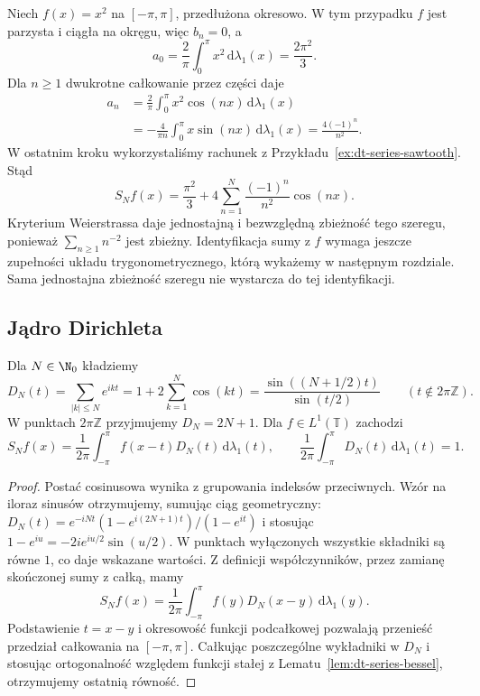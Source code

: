 \begin{przyklad}
\label{ex:dt-series-quadratic}
Niech $f(x)=x^2$ na $[-\pi,\pi]$, przedłużona okresowo.
W tym przypadku $f$ jest parzysta i ciągła na okręgu,
więc $b_n=0$, a
\[
 a_0=\frac2\pi\int_0^\pi x^2\,\mathrm d\lambda_1(x)
 =\frac{2\pi^2}3.
\]
Dla $n\ge1$ dwukrotne całkowanie przez części daje
\[
 \begin{aligned}
 a_n&=\frac2\pi\int_0^\pi x^2\cos(nx)\,\mathrm d\lambda_1(x)\\
 &=-\frac4{\pi n}\int_0^\pi x\sin(nx)\,\mathrm d\lambda_1(x)
 =\frac{4(-1)^n}{n^2}.
 \end{aligned}
\]
W ostatnim kroku wykorzystaliśmy rachunek z
Przykładu~\ref{ex:dt-series-sawtooth}.
Stąd
\[
 S_Nf(x)=\frac{\pi^2}3+
 4\sum_{n=1}^N\frac{(-1)^n}{n^2}\cos(nx).
\]
Kryterium Weierstrassa daje jednostajną i bezwzględną
zbieżność tego szeregu, ponieważ $\sum_{n\ge1}n^{-2}$
jest zbieżny. Identyfikacja sumy z $f$ wymaga jeszcze
zupełności układu trygonometrycznego, którą
wykażemy w następnym rozdziale. Sama jednostajna
zbieżność szeregu nie wystarcza do tej identyfikacji.
\end{przyklad}

\subsection{Jądro Dirichleta}

\begin{stwierdzenie}
\label{prop:dt-series-dirichlet}
Dla $N\in\N_0$ kładziemy
\[
 D_N(t)=\sum_{|k|\le N}e^{ikt}
 =1+2\sum_{k=1}^N\cos(kt)
 =\frac{\sin((N+1/2)t)}{\sin(t/2)}
 \qquad(t\notin2\pi\mathbb Z).
\]
W punktach $2\pi\mathbb Z$ przyjmujemy $D_N=2N+1$.
Dla $f\in L^1(\mathbb T)$ zachodzi
\[
 S_Nf(x)=\frac1{2\pi}\int_{-\pi}^{\pi}
 f(x-t)D_N(t)\,\mathrm d\lambda_1(t),
 \qquad
 \frac1{2\pi}\int_{-\pi}^{\pi}D_N(t)\,\mathrm d\lambda_1(t)=1.
\]
\end{stwierdzenie}
\begin{proof}
Postać cosinusowa wynika z grupowania indeksów
przeciwnych. Wzór na iloraz sinusów otrzymujemy,
sumując ciąg geometryczny:
$D_N(t)=e^{-iNt}(1-e^{i(2N+1)t})/(1-e^{it})$
i stosując $1-e^{iu}=-2ie^{iu/2}\sin(u/2)$.
W punktach wyłączonych wszystkie składniki są
równe $1$, co daje wskazane wartości.
Z definicji współczynników, przez zamianę skończonej
sumy z całką, mamy
\[
 S_Nf(x)=\frac1{2\pi}\int_{-\pi}^{\pi}
 f(y)D_N(x-y)\,\mathrm d\lambda_1(y).
\]
Podstawienie $t=x-y$ i okresowość funkcji
podcałkowej pozwalają przenieść przedział całkowania
na $[-\pi,\pi]$. Całkując poszczególne wykładniki
w $D_N$ i stosując ortogonalność względem funkcji
stałej z Lematu~\ref{lem:dt-series-bessel}, otrzymujemy
ostatnią równość.
\end{proof}

